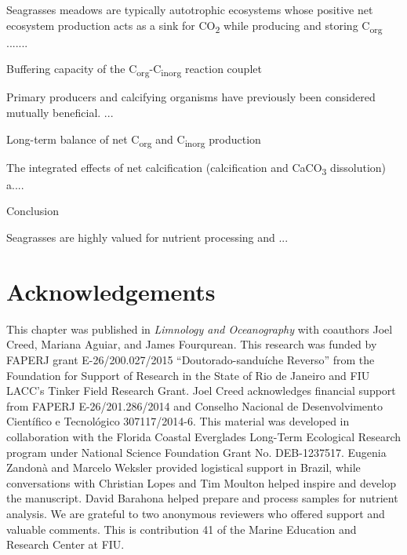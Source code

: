 Seagrasses meadows are typically autotrophic ecosystems whose positive net ecosystem production acts as a sink for CO\textsubscript{2} while producing and storing C\textsubscript{org} .......

\bigskip
\noindent Buffering capacity of the C\textsubscript{org}-C\textsubscript{inorg} reaction couplet
\medskip

Primary producers and calcifying organisms have previously been considered mutually beneficial. ...

\bigskip
\noindent Long-term balance of net C\textsubscript{org} and C\textsubscript{inorg} production
\medskip


The integrated effects of net calcification (calcification and CaCO\textsubscript{3} dissolution) a....

\bigskip
\noindent Conclusion
\medskip

Seagrasses are highly valued for nutrient processing and ...




\section{Acknowledgements}

This chapter was published in \textit{Limnology and Oceanography} with coauthors Joel Creed, Mariana Aguiar, and James Fourqurean. This research was funded by FAPERJ grant E-26/200.027/2015 “Doutorado-sanduíche Reverso” from the Foundation for Support of Research in the State of Rio de Janeiro and FIU LACC’s Tinker Field Research Grant. Joel Creed acknowledges financial support from FAPERJ E-26/201.286/2014 and Conselho Nacional de Desenvolvimento Científico e Tecnológico 307117/2014-6. This material was developed in collaboration with the Florida Coastal Everglades Long-Term Ecological Research program under National Science Foundation Grant No. DEB-1237517. Eugenia Zandonà and Marcelo Weksler provided logistical support in Brazil, while conversations with Christian Lopes and Tim Moulton helped inspire and develop the manuscript. David Barahona helped prepare and process samples for nutrient analysis. We are grateful to two anonymous reviewers who offered support and valuable comments. This is contribution 41 of the Marine Education and Research Center at FIU.
